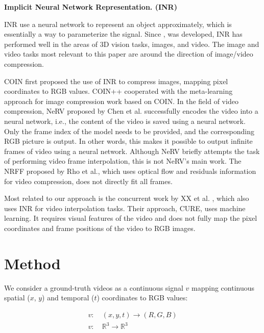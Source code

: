 \documentclass{article}
\begin{document}
\textbf{Implicit Neural Network Representation. (INR)}

INR use a neural network to represent an object approximately, which is essentially a way to parameterize the signal.
Since \cite{mildenhall2020nerf}, \cite{sitzmann2020implicit} was developed, INR has performed well in the areas of 3D vision tasks, images, and video.
The image and video tasks most relevant to this paper are around the direction of image/video compression.

COIN \cite{dupont2021coin} first proposed the use of INR to compress images, mapping pixel coordinates to RGB values.
COIN++ \cite{dupont2022coin++} cooperated with the meta-learning approach for image compression work based on COIN.
In the field of video compression, NeRV \cite{chen2021nerv} proposed by Chen et al. successfully encodes the video into a neural network, i.e., the content of the video is saved using a neural network.
Only the frame index of the model needs to be provided, and the corresponding RGB picture is output.
In other words, this makes it possible to output infinite frames of video using a neural network.
Although NeRV briefly attempts the task of performing video frame interpolation, this is not NeRV's main work.
The NRFF \cite{rho2022neural} proposed by Rho et al., which uses optical flow and residuals information for video compression, does not directly fit all frames.

Most related to our approach is the concurrent work by XX et al. \cite{shangguan2022learning}, which also uses INR for video interpolation tasks.
Their approach, CURE, uses machine learning.
It requires visual features of the video and does not fully map the pixel coordinates and frame positions of the video to RGB images.


\section{Method}

We consider a ground-truth videos as a continuous signal $v$ mapping continuous spatial ($x$, $y$) and temporal ($t$) coordinates to RGB values:

\begin{equation}
\begin{aligned}
v:& \: (x, y, t) \rightarrow (R, G, B) \\
v:& \: \mathbb{R}^3 \rightarrow \mathbb{R}^3
\end{aligned}
\end{equation}
\end{document}
